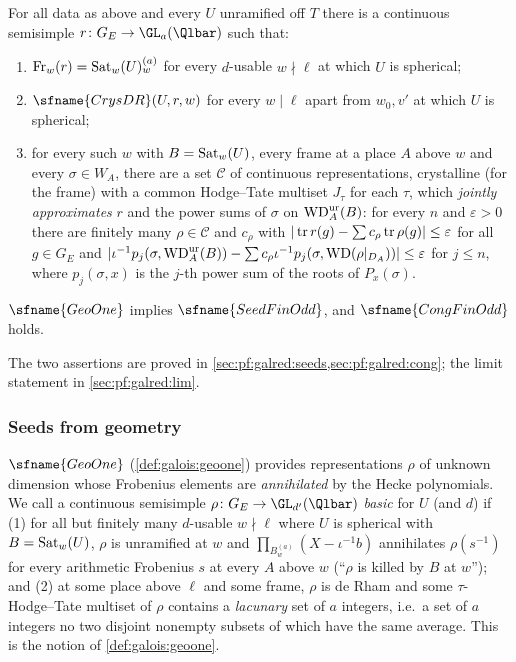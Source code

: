 \begin{definition}\label{pf:galred:limdef}
For all data as above and every $U$ unramified off $T$ there is a continuous semisimple $r\colon
G_E\to\GL_a(\Qlbar)$ such that:
\begin{enumerate}[label=(L\arabic*),nosep]
\item $\operatorname{Fr}_w(r)=\operatorname{Sat}_w(U)^{(a)}_w$ for every $d$-usable $w\nmid\ell$ at which $U$ is spherical;
\item $\sfname{CrysDR}(U,r,w)$ for every $w\mid\ell$ apart from $w_0,v'$ at which $U$ is spherical;
\item for every such $w$ with $B=\operatorname{Sat}_w(U)$, every frame at a place $A$ above $w$ and every $\sigma\in W_A$, there are
  a set $\mathcal C$ of continuous representations, crystalline (for the frame) with a common Hodge--Tate multiset
  $J_\tau$ for each $\tau$, which \emph{jointly approximates} $r$ and the power sums of $\sigma$ on $\mathrm{WD}^{\mathrm{ur}}_A(B)$: for
  every $n$ and $\varepsilon>0$ there are finitely many $\rho\in\mathcal C$ and $c_\rho$ with $|\operatorname{tr} r(g)-\sum
  c_\rho\operatorname{tr}\rho(g)|\le\varepsilon$ for all $g\in G_E$ and $|\iota^{-1}p_j(\sigma,\mathrm{WD}^{\mathrm{ur}}_A(B))-\sum
  c_\rho\iota^{-1}p_j(\sigma,\mathrm{WD}(\rho|_{D_A}))|\le\varepsilon$ for $j\le n$, where $p_j(\sigma,x)$ is the $j$-th power
  sum of the roots of $P_x(\sigma)$.
\end{enumerate}
\end{definition}

\begin{theorem}\label{pf:galred:seedcong}
$\sfname{GeoOne}$ implies $\sfname{SeedFinOdd}$, and $\sfname{CongFinOdd}$ holds.
\end{theorem}

The two assertions are proved in \cref{sec:pf:galred:seeds,sec:pf:galred:cong}; the limit statement in
\cref{sec:pf:galred:lim}.

\subsubsection{Seeds from geometry}\label{sec:pf:galred:seeds}

$\sfname{GeoOne}$ (\cref{def:galois:geoone}) provides representations $\rho$ of unknown dimension whose Frobenius
elements are \emph{annihilated} by the Hecke polynomials. We call a continuous semisimple $\rho\colon
G_E\to\GL_{d'}(\Qlbar)$ \emph{basic} for $U$ (and $d$) if (1) for all but finitely many $d$-usable $w\nmid\ell$ where $U$ is
spherical with $B=\operatorname{Sat}_w(U)$, $\rho$ is unramified at $w$ and $\prod_{B^{(a)}_w}(X-\iota^{-1}b)$ annihilates
$\rho(s^{-1})$ for every arithmetic Frobenius $s$ at every $A$ above $w$ (``$\rho$ is killed by $B$ at $w$''); and (2) at some place
above $\ell$ and some frame, $\rho$ is de Rham and some $\tau$-Hodge--Tate multiset of $\rho$ contains a \emph{lacunary}
set of $a$ integers, i.e.\ a set of $a$ integers no two disjoint nonempty subsets of which have the same average. This
is the notion of \cref{def:galois:geoone}.

